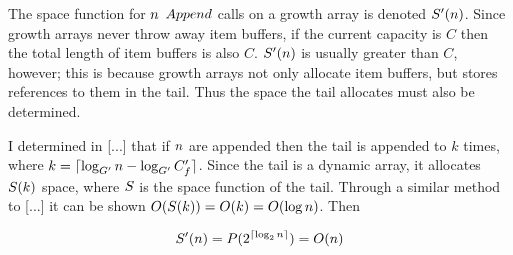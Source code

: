 \HdrSpaceComplex

The space function for $n$ $Append$ calls on a growth array is denoted $S'(n)$. Since growth arrays never throw away item buffers, if the current capacity is $C$ then the total length of item buffers is also $C$. $S'(n)$ is usually greater than $C$, however; this is because growth arrays not only allocate item buffers, but stores references to them in the tail. Thus the space the tail allocates must also be determined.

I determined in [...] that if $n$ are appended then the tail is appended to $k$ times, where $k = \lceil \log_{G'} n - \log_{G'} C_f' \rceil$. Since the tail is a dynamic array, it allocates $S(k)$ space, where $S$ is the space function of the tail. Through a similar method to [...] it can be shown $O(S(k)) = O(k) = O(\log n)$. Then %

\begin{align*}
S'(n) = P(2^{\lceil \log_2 n \rceil}) = O(n)
\end{align*}